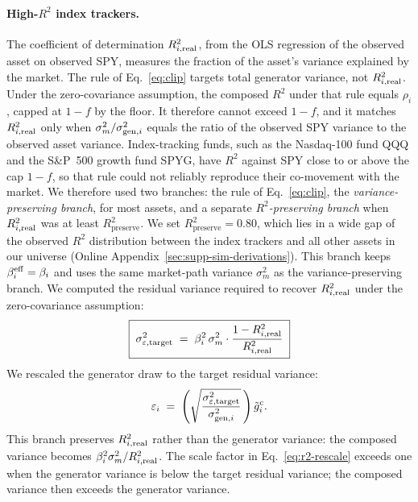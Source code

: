 \paragraph{High-$R^2$ index trackers.}

The coefficient of determination $R^2_{i,\mathrm{real}}$, from the OLS
regression of the observed asset on observed SPY, measures the
fraction of the asset's variance explained by the market. The rule of
Eq.~\eqref{eq:clip} targets total generator variance, not
$R^2_{i,\mathrm{real}}$. Under the zero-covariance
assumption, the composed $R^2$ under that rule equals $\rho_i$, capped
at $1-f$ by the floor. It therefore cannot exceed $1-f$, and it matches $R^2_{i,\mathrm{real}}$ only
when $\sigma_m^2/\sigma_{\mathrm{gen},i}^2$ equals the ratio of the observed SPY
variance to the observed asset variance. Index-tracking funds, such as the Nasdaq-100 fund QQQ and the
S\&P~500 growth fund SPYG, have $R^2$ against SPY close to or above
the cap $1-f$, so that rule could not reliably reproduce their co-movement with the
market. We therefore used two branches: the rule of
Eq.~\eqref{eq:clip}, the \emph{variance-preserving branch}, for most
assets, and a separate \emph{$R^2$-preserving branch} when
$R^2_{i,\mathrm{real}}$ was at least $R^2_{\mathrm{preserve}}$. We set $R^2_{\mathrm{preserve}}=0.80$,
which lies in a wide gap of the observed $R^2$ distribution between
the index trackers and all other assets in our universe
(Online Appendix~\ref{sec:supp-sim-derivations}). This branch keeps $\beta_i^{\mathrm{eff}}=\beta_i$ and uses the same
market-path variance $\sigma_m^2$ as the variance-preserving branch.
We computed the residual variance required to recover $R^2_{i,\mathrm{real}}$
under the zero-covariance
assumption:
\begin{equation}
  \boxed{\;\sigma_{\varepsilon,\mathrm{target}}^2 \;=\; \beta_i^2\, \sigma_m^2 \cdot
    \frac{1 - R^2_{i,\mathrm{real}}}{R^2_{i,\mathrm{real}}}\;}
  \label{eq:r2-target}
\end{equation}
We rescaled the generator draw to the target residual variance:
\begin{equation}
  \varepsilon_i \;=\; \left(\sqrt{\frac{\sigma_{\varepsilon,\mathrm{target}}^2}{\sigma_{\mathrm{gen},i}^2}}\,\right)\tilde{g}_i^{\mathrm c}.
  \label{eq:r2-rescale}
\end{equation}
This branch preserves $R^2_{i,\mathrm{real}}$ rather than the generator
variance: the composed variance becomes
$\beta_i^2\sigma_m^2/R^2_{i,\mathrm{real}}$. The scale factor in Eq.~\eqref{eq:r2-rescale} exceeds one when the generator variance is below the target residual
variance; the composed variance then exceeds the generator variance.

